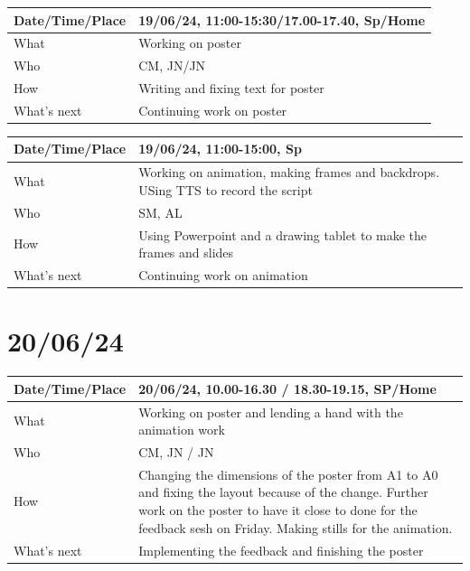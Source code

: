 \documentclass{article}
\begin{document}
\begin{table}[H]
\begin{tabular}{|p{1.5in}|p{4in}|}
\hline
Date/Time/Place & 19/06/24, 11:00-15:30/17.00-17.40, Sp/Home \\ \hline
What            & Working on poster \\ \hline
Who             & CM, JN/JN \\ \hline
How             & Writing and fixing text for poster \\ \hline
What's next     & Continuing work on poster \\ \hline
\end{tabular}
\end{table}

\begin{table}[H]
\begin{tabular}{|p{1.5in}|p{4in}|}
\hline
Date/Time/Place & 19/06/24, 11:00-15:00, Sp \\ \hline
What            & Working on animation, making frames and backdrops. USing TTS to record the script \\ \hline
Who             & SM, AL \\ \hline
How             & Using Powerpoint and a drawing tablet to make the frames and slides \\ \hline
What's next     & Continuing work on animation \\ \hline
\end{tabular}
\end{table}

\section{20/06/24}

\begin{table}[H]
\begin{tabular}{|p{1.5in}|p{4in}|}
\hline
Date/Time/Place & 20/06/24, 10.00-16.30 / 18.30-19.15, SP/Home \\ \hline
What            & Working on poster and lending a hand with the animation work \\ \hline
Who             & CM, JN / JN \\ \hline
How             & Changing the dimensions of the poster from A1 to A0 and fixing the layout because of the change. Further work on the poster to have it close to done for the feedback sesh on Friday. Making stills for the animation. \\ \hline
What's next     & Implementing the feedback and finishing the poster \\ \hline
\end{tabular}
\end{table}
\end{document}
